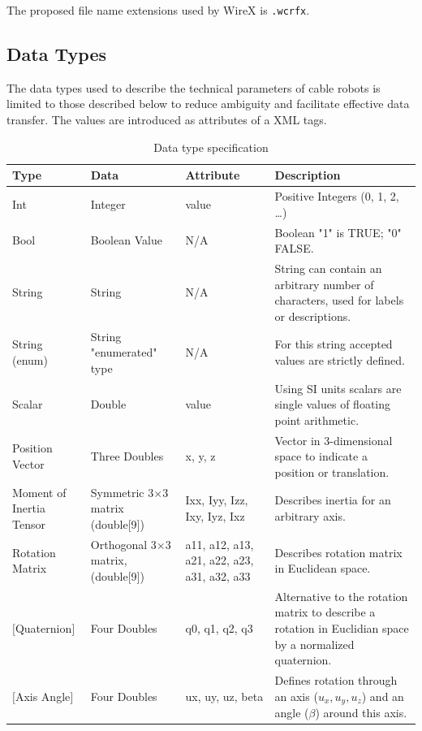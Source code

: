The proposed file name extensions used by WireX is \texttt{.wcrfx}. 

\subsection{Data Types}%
The data types used to describe the technical parameters of cable robots is
limited to those described below to reduce ambiguity and facilitate effective
data transfer. The values are introduced as attributes of a XML tags.

\begin{table}
  \centering
  \caption{Data type specification}
  \label{tab:XmlDataTypeSpecs}
  \begin{tabular}{p{}p{}p{}p{}}
    \hline\hline
    Type  &  Data  &  Attribute  & Description \\
    \hline
    Int & Integer & value & Positive Integers (0, 1, 2, \ldots)\\
    Bool & Boolean Value &  N/A & Boolean "1" is TRUE; "0" FALSE.\\
    String & String & N/A & String can contain an arbitrary number of
    characters, used for labels or descriptions.\\
    String (enum) & String "enumerated" type & N/A & For this string
    accepted values are strictly defined.\\
    Scalar & Double &  value  & Using SI units scalars are single values
    of floating point arithmetic. \\
    Position Vector & Three Doubles &  x, y, z &
    Vector in 3-dimensional space to indicate a position or translation.\\
    Moment of Inertia Tensor &  Symmetric 3$\times$3 matrix (double[9]) &
    Ixx, Iyy, Izz, Ixy, Iyz, Ixz &  Describes inertia for an arbitrary axis.\\
    Rotation Matrix & Orthogonal 3$\times$3 matrix, (double[9]) &  a11, a12,
    a13, a21, a22, a23, a31, a32, a33 & Describes rotation matrix in Euclidean space.\\
    $[$Quaternion$]$ & Four Doubles & q0, q1, q2, q3 & Alternative to the
    rotation matrix to describe a rotation in Euclidian space by a normalized quaternion.\\
    $[$Axis Angle$]$ & Four Doubles & ux, uy, uz, beta & Defines rotation
    through an axis ($u_x,u_y,u_z$) and an angle ($\beta$) around this
    axis.\\
    \hline\hline
  \end{tabular}
\end{table}

